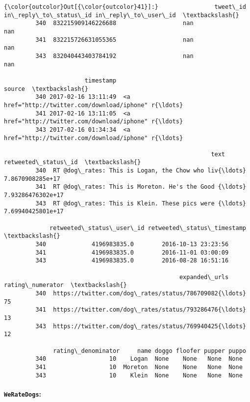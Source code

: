 \documentclass[11pt]{article}
\begin{document}
\begin{Verbatim}[commandchars=\\\{\}]
{\color{outcolor}Out[{\color{outcolor}41}]:}                tweet\_id in\_reply\_to\_status\_id in\_reply\_to\_user\_id  \textbackslash{}
         340  832215909146226688                   nan                 nan   
         341  832215726631055365                   nan                 nan   
         343  832040443403784192                   nan                 nan   
         
                       timestamp                                             source  \textbackslash{}
         340 2017-02-16 13:11:49  <a href="http://twitter.com/download/iphone" r{\ldots}   
         341 2017-02-16 13:11:05  <a href="http://twitter.com/download/iphone" r{\ldots}   
         343 2017-02-16 01:34:34  <a href="http://twitter.com/download/iphone" r{\ldots}   
         
                                                           text retweeted\_status\_id  \textbackslash{}
         340  RT @dog\_rates: This is Logan, the Chow who liv{\ldots}    7.8670908285e+17   
         341  RT @dog\_rates: This is Moreton. He's the Good {\ldots}   7.93286476302e+17   
         343  RT @dog\_rates: This is Klein. These pics were {\ldots}   7.69940425801e+17   
         
             retweeted\_status\_user\_id retweeted\_status\_timestamp  \textbackslash{}
         340             4196983835.0        2016-10-13 23:23:56   
         341             4196983835.0        2016-11-01 03:00:09   
         343             4196983835.0        2016-08-28 16:51:16   
         
                                                  expanded\_urls  rating\_numerator  \textbackslash{}
         340  https://twitter.com/dog\_rates/status/786709082{\ldots}                75   
         341  https://twitter.com/dog\_rates/status/793286476{\ldots}                13   
         343  https://twitter.com/dog\_rates/status/769940425{\ldots}                12   
         
              rating\_denominator     name doggo floofer pupper puppo  
         340                  10    Logan  None    None   None  None  
         341                  10  Moreton  None    None   None  None  
         343                  10    Klein  None    None   None  None  
\end{Verbatim}
            
    \hypertarget{weratedogs}{%
\paragraph{\texorpdfstring{\texttt{WeRateDogs}:}{WeRateDogs:}}\label{weratedogs}}
\end{document}
